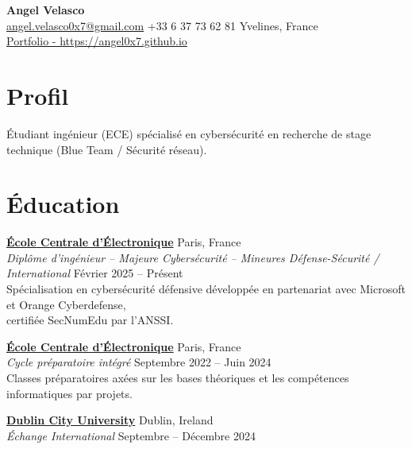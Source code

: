 \documentclass[a4paper,10pt]{article}
\newcommand{\linkedtitle}[2]{\href{#1}{\textbf{\color{myblue}#2}}}
\begin{document}
\begin{center}
    {\LARGE \textbf{Angel Velasco}}\\[3pt]
    \small
    \href{mailto:angel.velasco0x7@gmail.com}{angel.velasco0x7@gmail.com} \quad
    +33 6 37 73 62 81 \quad
    Yvelines, France \\
    {\Large \href{https://angel0x7.github.io}{Portfolio - https://angel0x7.github.io}} 
\end{center}



\section*{Profil}

\begin{center}
Étudiant ingénieur (ECE) spécialisé en cybersécurité en recherche de stage technique (Blue Team / Sécurité réseau).
\end{center}

\section*{Éducation}

\noindent
\linkedtitle{https://www.ece.fr/en/program/engineering-cycle-bac4-information-systems-and-cybersecurity-major/}{École Centrale d'Électronique} \hfill Paris, France \\
\emph{Diplôme d'ingénieur – Majeure Cybersécurité – Mineures Défense-Sécurité / International} \hfill Février 2025 -- Présent \\
Spécialisation en cybersécurité défensive développée en partenariat avec Microsoft et Orange Cyberdefense,\\ certifiée SecNumEdu par l’ANSSI. 


\noindent
\linkedtitle{https://www.ece.fr/}{École Centrale d'Électronique} \hfill Paris, France \\
\emph{Cycle préparatoire intégré} \hfill Septembre 2022 -- Juin 2024 \\
Classes préparatoires axées sur les bases théoriques et les compétences informatiques par projets. 


\noindent
\linkedtitle{https://www.dcu.ie/}{Dublin City University} \hfill Dublin, Ireland \\
\emph{Échange International} \hfill Septembre -- Décembre 2024 

\end{document}
